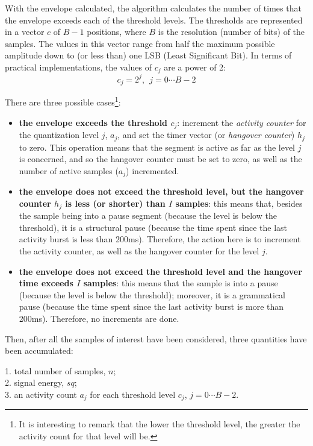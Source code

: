 With the envelope calculated, the algorithm calculates the number of
times that the envelope exceeds each of the threshold levels. The
thresholds are represented in a vector $c$ of $B-1$ positions, where
$B$ is the resolution (number of bits) of the samples. The values in
this vector range from half the maximum possible amplitude down to (or
less than) one LSB (Least Significant Bit). In terms of practical
implementations, the values of $c_j$ are a power of 2:
\[ 
      c_j = 2^j, \ \ j=0 \cdots B-2
\]

There are three possible cases\footnote{\SF It is interesting to remark that
the lower the threshold level, the greater the activity count for that level
will be.}: 
\begin{itemize}
  \item {\bf the envelope exceeds the threshold $c_j$}:  increment the {\em
        activity counter} for the quantization level $j$, $a_j$, and set
        the timer vector (or {\em hangover counter}) $h_j$ to zero.  This
        operation means that the segment is active as far as the level $j$ is
        concerned, and so the hangover counter must be set to zero, as well as
        the number of active samples ($a_j$) incremented.

 \item  {\bf the envelope does not exceed the threshold level, but the 
        hangover counter $h_j$ is less (or shorter) than $I$ samples}:
        this means that, besides the sample being into a pause segment
        (because the level is below the threshold), it is a structural
        pause (because the time spent since the last activity burst is
        less than 200ms). Therefore, the action here is to increment
        the activity counter, as well as the hangover counter for the
        level $j$.

 \item  {\bf the envelope does not exceed the threshold level and the
        hangover time exceeds $I$ samples}: this means that the sample
        is into a pause (because the level is below the threshold);
        moreover, it is a grammatical pause (because the time spent
        since the last activity burst is more than 200ms). Therefore,
        no increments are done.
\end{itemize}

Then, after all the samples of interest have been considered, three
quantities have been accumulated:

 \parbox[t]{140mm}{
1. total number of samples, $n$;\\
2. signal energy, $sq$;\\
3. an activity count $a_j$ for each threshold level 
        $c_j$, $j=0 \cdots B-2$.
}

